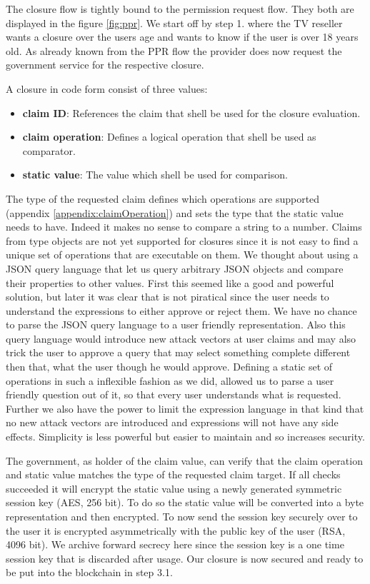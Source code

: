 The closure flow is tightly bound to the permission request flow. They both are displayed in the figure \ref{fig:ppr}.  We start off by step 1. where the TV reseller wants a closure over the users age and wants to know if the user is over 18 years old. As already known from the PPR flow the provider does now request the government service for the respective closure. 

\noindent A closure in code form consist of three values: 
\begin{itemize}
\item \textbf{claim ID}: References the claim that shell be used for the closure evaluation. 
\item \textbf{claim operation}: Defines a logical operation that shell be used as comparator. 
\item \textbf{static value}: The value which shell be used for comparison. 
\end{itemize}

The type of the requested claim defines which operations are supported (appendix \ref{appendix:claimOperation}) and sets the type that the static value needs to have. Indeed it makes no sense to compare a string to a number. Claims from type objects are not yet supported for closures since it is not easy to find a unique set of operations that are executable on them. We thought about using a JSON query language that let us query arbitrary JSON objects and compare their properties to other values. First this seemed like a good and powerful solution, but later it was clear that is not piratical since the user needs to understand the expressions to either approve or reject them. We have no chance to parse the JSON query language to a user friendly representation. Also this query language would introduce new attack vectors at user claims and may also trick the user to approve a query that may select something complete different then that, what the user though he would approve. Defining a static set of operations in such a inflexible fashion as we did, allowed us to parse a user friendly question out of it, so that every user understands what is requested. Further we also have the power to limit the expression language in that kind that no new attack vectors are introduced and expressions will not have any side effects. Simplicity is less powerful but easier to maintain and so increases security. 

The government, as holder of the claim value, can verify that the claim operation and static value matches the type of the requested claim target. If all checks succeeded it will encrypt the static value using a newly generated symmetric session key (AES, 256 bit). To do so the static value will be converted into a byte representation and then encrypted. To now send the session key securely over to the user it is encrypted asymmetrically with the public key of the user (RSA, 4096 bit). We archive forward secrecy here since the session key is a one time session key that is discarded after usage. Our closure is now secured and ready to be put into the blockchain in step 3.1. 

